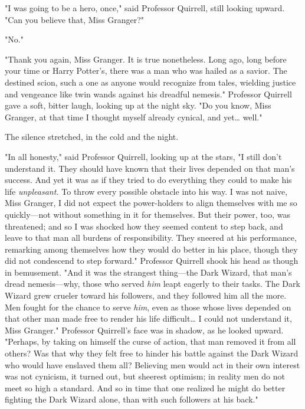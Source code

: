"I was going to be a hero, once," said Professor Quirrell, still looking 
upward. "Can you believe that, Miss Granger?"

"No."

"Thank you again, Miss Granger. It is true nonetheless. Long ago, long before 
your time or Harry Potter's, there was a man who was hailed as a savior. The 
destined scion, such a one as anyone would recognize from tales, wielding 
justice and vengeance like twin wands against his dreadful nemesis." Professor 
Quirrell gave a soft, bitter laugh, looking up at the night sky. "Do you know, 
Miss Granger, at that time I thought myself already cynical, and yet{\ldots} 
well."

The silence stretched, in the cold and the night.

"In all honesty," said Professor Quirrell, looking up at the stars, "I still 
don't understand it. They should have known that their lives depended on that 
man's success. And yet it was as if they tried to do everything they could to 
make his life \emph{unpleasant.} To throw every possible obstacle into his way. 
I was not naive, Miss Granger, I did not expect the power-holders to align 
themselves with me so quickly---not without something in it for themselves. But 
their power, too, was threatened; and so I was shocked how they seemed content 
to step back, and leave to that man all burdens of responsibility. They sneered 
at his performance, remarking among themselves how they would do better in his 
place, though they did not condescend to step forward." Professor Quirrell 
shook his head as though in bemusement. "And it was the strangest thing---the 
Dark Wizard, that man's dread nemesis---why, those who served \emph{him} leapt 
eagerly to their tasks. The Dark Wizard grew crueler toward his followers, and 
they followed him all the more. Men fought for the chance to serve \emph{him}, 
even as those whose lives depended on that other man made free to render his 
life difficult{\ldots} I could not understand it, Miss Granger." Professor 
Quirrell's face was in shadow, as he looked upward. "Perhaps, by taking on 
himself the curse of action, that man removed it from all others? Was that why 
they felt free to hinder his battle against the Dark Wizard who would have 
enslaved them all? Believing men would act in their own interest was not 
cynicism, it turned out, but sheerest optimism; in reality men do not meet so 
high a standard. And so in time that one realized he might do better fighting 
the Dark Wizard alone, than with such followers at his back."


